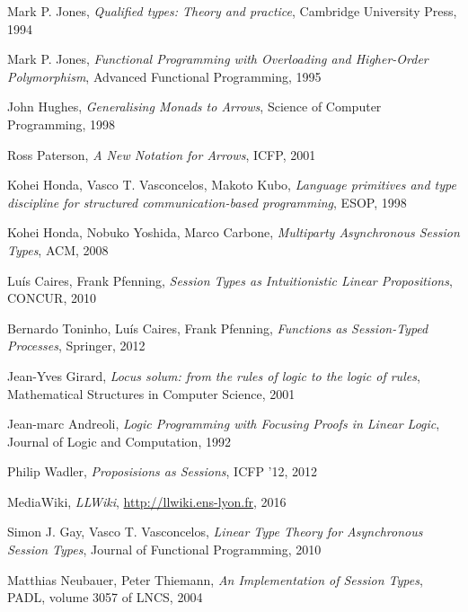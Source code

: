 \documentclass{article}
\begin{document}
\begin{thebibliography}{99}
    Mark P. Jones,
    \emph{Qualified types: Theory and practice},
    Cambridge University Press,
    1994

    Mark P. Jones,
    \emph{Functional Programming with
      Overloading and Higher-Order Polymorphism},
    Advanced Functional Programming,
    1995

    John Hughes,
    \emph{Generalising Monads to Arrows},
    Science of Computer Programming,
    1998

    Ross Paterson,
    \emph{A New Notation for Arrows},
    ICFP,
    2001

    Kohei Honda, Vasco T. Vasconcelos, Makoto Kubo,
    \emph{Language primitives and type discipline for structured
      communication-based programming},
    ESOP,
    1998

    Kohei Honda, Nobuko Yoshida, Marco Carbone,
    \emph{Multiparty Asynchronous Session Types},
    ACM,
    2008

    Lu\'is Caires, Frank Pfenning,
    \emph{Session Types as Intuitionistic Linear Propositions},
    CONCUR,
    2010

    Bernardo Toninho, Lu\'is Caires, Frank Pfenning,
    \emph{Functions as Session-Typed Processes},
    Springer,
    2012

    Jean-Yves Girard,
    \emph{Locus solum: from the rules of logic to the logic of rules},
    Mathematical Structures in Computer Science,
    2001

    Jean-marc Andreoli,
    \emph{Logic Programming with Focusing Proofs in Linear Logic},
    Journal of Logic and Computation,
    1992

    Philip Wadler,
    \emph{Proposisions as Sessions},
    ICFP '12,
    2012

    MediaWiki,
    \emph{LLWiki},
    \url{http://llwiki.ens-lyon.fr},
    2016

    Simon J. Gay, Vasco T. Vasconcelos,
    \emph{Linear Type Theory for Asynchronous Session Types},
    Journal of Functional Programming,
    2010

    Matthias Neubauer, Peter Thiemann,
    \emph{An Implementation of Session Types},
    PADL, volume 3057 of LNCS,
    2004


\end{thebibliography}
\end{document}
